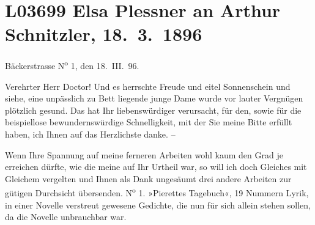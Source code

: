 

\section[Elsa Plessner an Arthur Schnitzler, 18. 3. 1896]{L03699 Elsa Plessner an Arthur Schnitzler, 18. 3. 1896}
\nopagebreak{}
\rehead{ }\normalsize\beginnumbering{}
\toendnotes[C]{\smallbreak\pagebreak[2]}
\toendnotes[C]{\smallbreak}
\pstart
           {\pb} Bäckerstrasse N\textsuperscript{o}
                     1, den 18. III. 96.\pend
           
\pstart{}Verehrter Herr Doctor!\pend\vspace{0.5em}
\pstart
           Und es herrschte Freude und eitel Sonnenschein und siehe, eine unpässlich zu Bett
               liegende junge Dame wurde vor lauter Vergnügen plötzlich gesund. Das hat Ihr
               liebenswürdiger \label{K_L03699-1v}\label{K_L03699-1} verursacht, für
               den, sowie für die beispiellose bewundernswürdige Schnelligkeit, mit der Sie meine
               Bitte erfüllt haben, ich Ihnen auf das Herzlichste danke. – \pend
           
\pstart
           Wenn Ihre Spannung auf meine ferneren Arbeiten wohl kaum den Grad je erreichen
               dürfte, wie die meine auf Ihr Urtheil war, so will ich doch Gleiches mit Gleichem
               vergelten und Ihnen als Dank ungesäumt drei andere Arbeiten zur gütigen Durchsicht
               übersenden. N\textsuperscript{o} 1. »Pierettes Tagebuch«, 19 Nummern {\pb}Lyrik, in einer Novelle verstreut gewesene Gedichte, die nun für sich
               allein stehen sollen, da die Novelle unbrauchbar war.\pend
           
